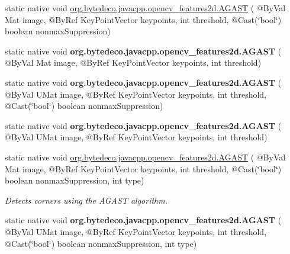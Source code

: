 \begin{DoxyCompactItemize}
\item 
static native void \hyperlink{group__features2d__main_ga849ee8acfb310ef13c3fd8a8f25327ed}{org.\+bytedeco.\+javacpp.\+opencv\+\_\+features2d.\+A\+G\+A\+ST} ( @By\+Val Mat image, @By\+Ref Key\+Point\+Vector keypoints, int threshold, @Cast(\char`\"{}bool\char`\"{}) boolean nonmax\+Suppression)
\item 
\mbox{\label{group__features2d__main_gaf22c6f99e6b9396740f6307a096af588}} 
static native void {\bfseries org.\+bytedeco.\+javacpp.\+opencv\+\_\+features2d.\+A\+G\+A\+ST} ( @By\+Val Mat image, @By\+Ref Key\+Point\+Vector keypoints, int threshold)
\item 
\mbox{\label{group__features2d__main_ga8117d36086a8026863c3a8efa69889f2}} 
static native void {\bfseries org.\+bytedeco.\+javacpp.\+opencv\+\_\+features2d.\+A\+G\+A\+ST} ( @By\+Val U\+Mat image, @By\+Ref Key\+Point\+Vector keypoints, int threshold, @Cast(\char`\"{}bool\char`\"{}) boolean nonmax\+Suppression)
\item 
\mbox{\label{group__features2d__main_ga7754d5ff319320963db994f854dd8184}} 
static native void {\bfseries org.\+bytedeco.\+javacpp.\+opencv\+\_\+features2d.\+A\+G\+A\+ST} ( @By\+Val U\+Mat image, @By\+Ref Key\+Point\+Vector keypoints, int threshold)
\item 
static native void \hyperlink{group__features2d__main_ga2126ee1b1b70316ae0fd6ffb3d2d51bc}{org.\+bytedeco.\+javacpp.\+opencv\+\_\+features2d.\+A\+G\+A\+ST} ( @By\+Val Mat image, @By\+Ref Key\+Point\+Vector keypoints, int threshold, @Cast(\char`\"{}bool\char`\"{}) boolean nonmax\+Suppression, int type)
\begin{DoxyCompactList}\small\item\em Detects corners using the A\+G\+A\+ST algorithm. \end{DoxyCompactList}\item 
\mbox{\label{group__features2d__main_gad2865f6a56af34b53c7e3ebb3abd2b6c}} 
static native void {\bfseries org.\+bytedeco.\+javacpp.\+opencv\+\_\+features2d.\+A\+G\+A\+ST} ( @By\+Val U\+Mat image, @By\+Ref Key\+Point\+Vector keypoints, int threshold, @Cast(\char`\"{}bool\char`\"{}) boolean nonmax\+Suppression, int type)
\end{DoxyCompactItemize}


